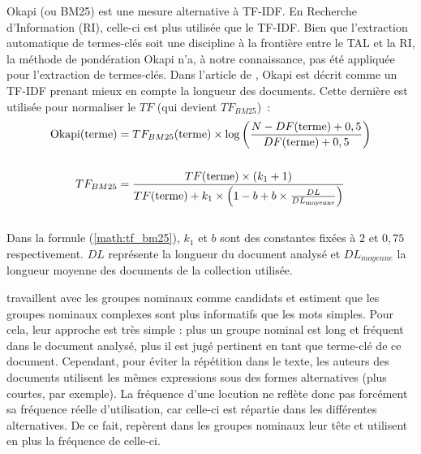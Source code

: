           Okapi (ou BM25) \citep{robertson1999okapi} est une mesure alternative
          à TF-IDF. En Recherche d'Information (RI), celle-ci est plus utilisée
          que le TF-IDF. Bien que l'extraction automatique de termes-clés soit
          une discipline à la frontière entre le TAL et la RI, la méthode de
          pondération Okapi n'a, à notre connaissance, pas été appliquée pour
          l'extraction de termes-clés. Dans l'article de
          \citet{claveau2012vectorisation}, Okapi est décrit comme un TF-IDF
          prenant mieux en compte la longueur des documents. Cette dernière est
          utilisée pour normaliser le $TF$ (qui devient $TF_{BM25}$)~:
          \begin{align}
            \text{Okapi}(\text{terme}) &= TF_{BM25}(\text{terme}) \times \log\left(\frac{N - DF(\text{terme}) + 0,5}{DF(\text{terme}) + 0,5}\right) \label{math:okapi}\\
            \notag\\
            TF_{BM25} &= \frac{TF(\text{terme}) \times (k_1 + 1)}{TF(\text{terme}) + k_1 \times \left(1 - b + b \times \frac{DL}{DL_{\text{moyenne}}}\right)} \label{math:tf_bm25}
          \end{align}\\
          Dans la formule (\ref{math:tf_bm25}), $k_1$ et $b$ sont des constantes
          fixées à $2$ et $0,75$ respectivement. $DL$ représente la longueur du
          document analysé et $DL_{moyenne}$ la longueur moyenne des documents
          de la collection utilisée.

          \citet{barker2000nounphrasehead} travaillent avec les groupes nominaux
          comme candidats et estiment que les groupes nominaux complexes sont
          plus informatifs que les mots simples. Pour cela, leur approche est
          très simple : plus un groupe nominal est long et fréquent dans le
          document analysé, plus il est jugé pertinent en tant que terme-clé de
          ce document. Cependant, pour éviter la répétition dans le texte, les
          auteurs des documents utilisent les mêmes expressions sous des formes
          alternatives (plus courtes, par exemple). La fréquence d'une locution
          ne reflète donc pas forcément sa fréquence réelle d'utilisation, car
          celle-ci est répartie dans les différentes alternatives. De ce fait,
          \citet{barker2000nounphrasehead} repèrent dans les groupes nominaux
          leur tête et utilisent en plus la fréquence de celle-ci.

